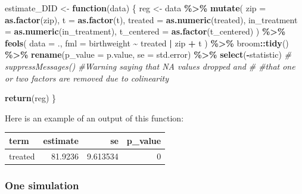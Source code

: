 \documentclass[
]{article}
\newenvironment{Shaded}{\begin{snugshade}}{\end{snugshade}}
\newcommand{\AttributeTok}[1]{\textcolor[rgb]{0.13,0.29,0.53}{#1}}
\newcommand{\CommentTok}[1]{\textcolor[rgb]{0.56,0.35,0.01}{\textit{#1}}}
\newcommand{\ControlFlowTok}[1]{\textcolor[rgb]{0.13,0.29,0.53}{\textbf{#1}}}
\newcommand{\FunctionTok}[1]{\textcolor[rgb]{0.13,0.29,0.53}{\textbf{#1}}}
\newcommand{\NormalTok}[1]{#1}
\newcommand{\OtherTok}[1]{\textcolor[rgb]{0.56,0.35,0.01}{#1}}
\newcommand{\SpecialCharTok}[1]{\textcolor[rgb]{0.81,0.36,0.00}{\textbf{#1}}}
\begin{document}
\begin{Shaded}
\begin{Highlighting}[]
\NormalTok{estimate\_DID }\OtherTok{\textless{}{-}} \ControlFlowTok{function}\NormalTok{(data) \{}
\NormalTok{  reg }\OtherTok{\textless{}{-}}\NormalTok{ data }\SpecialCharTok{\%\textgreater{}\%} 
    \FunctionTok{mutate}\NormalTok{(}
      \AttributeTok{zip =} \FunctionTok{as.factor}\NormalTok{(zip),}
      \AttributeTok{t =} \FunctionTok{as.factor}\NormalTok{(t),}
      \AttributeTok{treated =} \FunctionTok{as.numeric}\NormalTok{(treated),}
      \AttributeTok{in\_treatment =} \FunctionTok{as.numeric}\NormalTok{(in\_treatment),}
      \AttributeTok{t\_centered =} \FunctionTok{as.factor}\NormalTok{(t\_centered)}
\NormalTok{    ) }\SpecialCharTok{\%\textgreater{}\%} 
    \FunctionTok{feols}\NormalTok{(}
      \AttributeTok{data =}\NormalTok{ ., }
      \AttributeTok{fml =}\NormalTok{ birthweight }\SpecialCharTok{\textasciitilde{}}\NormalTok{ treated }\SpecialCharTok{|}\NormalTok{ zip }\SpecialCharTok{+}\NormalTok{ t}
\NormalTok{    ) }\SpecialCharTok{\%\textgreater{}\%} 
\NormalTok{    broom}\SpecialCharTok{::}\FunctionTok{tidy}\NormalTok{() }\SpecialCharTok{\%\textgreater{}\%} 
    \FunctionTok{rename}\NormalTok{(}\AttributeTok{p\_value =}\NormalTok{ p.value, }\AttributeTok{se =}\NormalTok{ std.error) }\SpecialCharTok{\%\textgreater{}\%} 
    \FunctionTok{select}\NormalTok{(}\SpecialCharTok{{-}}\NormalTok{statistic) }
    \CommentTok{\# suppressMessages() \#Warning saying that NA values dropped and }
    \CommentTok{\# \#that one or two factors are removed due to colinearity}
  
  \FunctionTok{return}\NormalTok{(reg)}
\NormalTok{\}}
\end{Highlighting}
\end{Shaded}

Here is an example of an output of this function:

\begin{longtable}[]{@{}lrrr@{}}
\toprule\noalign{}
term & estimate & se & p\_value \\
\midrule\noalign{}
\endhead
\bottomrule\noalign{}
\endlastfoot
treated & 81.9236 & 9.613534 & 0 \\
\end{longtable}

\hypertarget{one-simulation}{%
\subsubsection{One simulation}\label{one-simulation}}
\end{document}
